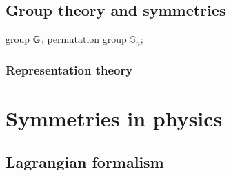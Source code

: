 \subsection{Group theory and symmetries}
group $\mathbb{G}$,
permutation group $\mathbb{S}_n$;

\subsubsection{Representation theory}\label{sec:representation_theory}

\section{Symmetries in physics}
\subsection{Lagrangian formalism}\label{sec:lagrangian}
